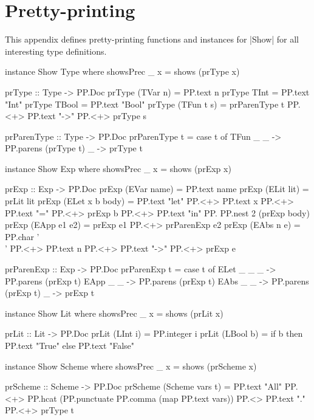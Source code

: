 \documentclass[a4paper,11pt]{article}
\begin{document}



\appendix

\section{Pretty-printing}
\label{sec:pretty-printing}

This appendix defines pretty-printing functions and instances for
|Show| for all interesting type definitions.

%
\begin{code}
instance Show Type where
    showsPrec _ x = shows (prType x)

prType             ::  Type -> PP.Doc
prType (TVar n)    =   PP.text n
prType TInt        =   PP.text "Int"
prType TBool       =   PP.text "Bool"
prType (TFun t s)  =   prParenType t PP.<+> PP.text "->" PP.<+> prType s

prParenType     ::  Type -> PP.Doc
prParenType  t  =   case t of
                      TFun _ _  -> PP.parens (prType t)
                      _         -> prType t

instance Show Exp where
    showsPrec _ x = shows (prExp x)

prExp                  ::  Exp -> PP.Doc
prExp (EVar name)      =   PP.text name
prExp (ELit lit)       =   prLit lit
prExp (ELet x b body)  =   PP.text "let" PP.<+> 
                           PP.text x PP.<+> PP.text "=" PP.<+>
                           prExp b PP.<+> PP.text "in" PP.$$
                           PP.nest 2 (prExp body)
prExp (EApp e1 e2)     =   prExp e1 PP.<+> prParenExp e2
prExp (EAbs n e)       =   PP.char '\\' PP.<+> PP.text n PP.<+>
                           PP.text "->" PP.<+>
                           prExp e
                                                                   

prParenExp    ::  Exp -> PP.Doc
prParenExp t  =   case t of
                    ELet _ _ _  -> PP.parens (prExp t)
                    EApp _ _    -> PP.parens (prExp t)
                    EAbs _ _    -> PP.parens (prExp t)
                    _           -> prExp t

instance Show Lit where
    showsPrec _ x = shows (prLit x)

prLit            ::  Lit -> PP.Doc
prLit (LInt i)   =   PP.integer i
prLit (LBool b)  =   if b then PP.text "True" else PP.text "False"

instance Show Scheme where
    showsPrec _ x = shows (prScheme x)

prScheme                  ::  Scheme -> PP.Doc
prScheme (Scheme vars t)  =   PP.text "All" PP.<+>
                              PP.hcat 
                                (PP.punctuate PP.comma (map PP.text vars))
                              PP.<> PP.text "." PP.<+> prType t
\end{code}
\end{document}
